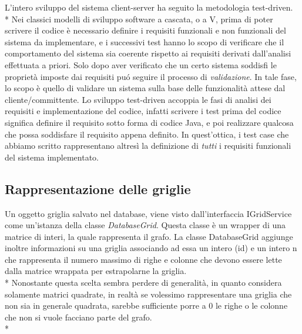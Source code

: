 L'intero sviluppo del sistema client-server ha seguito la metodologia test-driven.\\*
Nei classici modelli di sviluppo software a cascata, o a V, prima di poter scrivere il codice \`e necessario definire i requisiti funzionali e non funzionali del sistema da implementare, e i successivi test hanno lo scopo di verificare che il comportamento del sistema sia coerente rispetto ai requisiti derivati dall'analisi effettuata a priori. Solo dopo aver verificato che un certo sistema soddisfi le propriet\`a imposte dai requisiti pu\'o seguire il processo di \emph{validazione}. In tale fase, lo scopo \`e quello di validare un sistema sulla base delle funzionalit\`a attese dal cliente/committente.  Lo sviluppo test-driven accoppia le fasi di analisi dei requisiti e implementazione del codice, infatti scrivere i test prima del codice significa definire il requisito sotto forma di codice Java, e poi realizzare qualcosa che possa soddisfare il requisito appena definito. In quest'ottica, i test case che abbiamo scritto rappresentano altres\`i la definizione di \emph{tutti} i requisiti funzionali del sistema implementato.
\subsection{Rappresentazione delle griglie}
Un oggetto griglia salvato nel database, viene visto dall'interfaccia IGridService come un'istanza della classe \emph{DatabaseGrid}. Questa classe \`e un wrapper di una matrice di interi, la quale rappresenta il grafo. La classe DatabaseGrid aggiunge inoltre informazioni su una griglia associando ad essa un intero (id) e un intero n che rappresenta il numero massimo di righe e colonne che devono essere lette dalla matrice wrappata per estrapolarne la griglia.\\*
Nonostante questa scelta sembra perdere di generalit\`a, in quanto considera solamente matrici quadrate, in realt\`a se volessimo rappresentare una griglia che non sia in generale quadrata, sarebbe sufficiente porre a $0$ le righe o le colonne che non si vuole facciano parte del grafo.\\*
